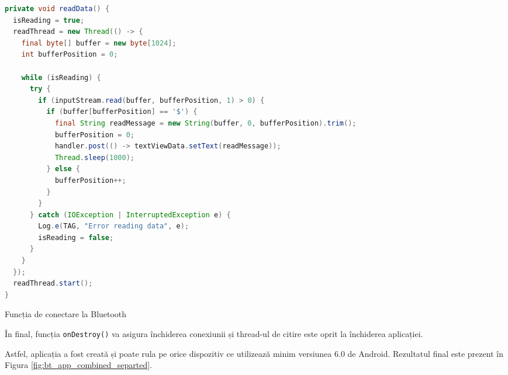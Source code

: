 \begin{code}[H]
\begin{lstlisting}[language=Java]
private void readData() {
  isReading = true;
  readThread = new Thread(() -> {
    final byte[] buffer = new byte[1024];
    int bufferPosition = 0;

    while (isReading) {
      try {
        if (inputStream.read(buffer, bufferPosition, 1) > 0) {
          if (buffer[bufferPosition] == '$') {
            final String readMessage = new String(buffer, 0, bufferPosition).trim();
            bufferPosition = 0;
            handler.post(() -> textViewData.setText(readMessage));
            Thread.sleep(1000);
          } else {
            bufferPosition++;
          }
        }
      } catch (IOException | InterruptedException e) {
        Log.e(TAG, "Error reading data", e);
        isReading = false;
      }
    }
  });
  readThread.start();
}
\end{lstlisting}
\caption{Funcția de conectare la Bluetooth \cite{bt_transfer}}
\label{code:bt_read_data}
\end{code}

În final, funcția \texttt{onDestroy()} va asigura închiderea conexiunii și thread-ul de citire este oprit la închiderea aplicației.

Astfel, aplicația a fost creată și poate rula pe orice dispozitiv ce utilizează minim versiunea 6.0 de Android. Rezultatul final este prezent în Figura \ref{fig:bt_app_combined_separted}.

